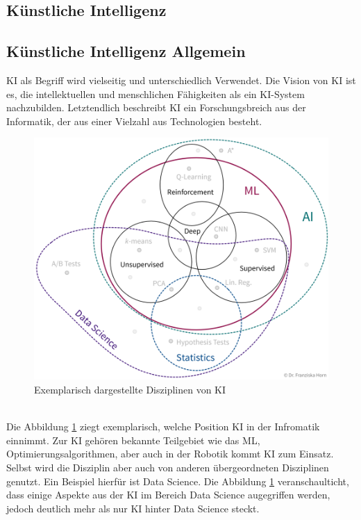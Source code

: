 \begin{onehalfspace}
    \newpage
    \section{Künstliche Intelligenz}
    \label{subsec:KIandML}
    \subsection{Künstliche Intelligenz Allgemein}
    \label{subsubsec:KIAllgemein}
        \ac{KI} als Begriff wird vielseitig und unterschiedlich Verwendet. Die Vision von \ac{KI} ist es, die intellektuellen und menschlichen Fähigkeiten als ein KI-System nachzubilden.\cite{Lis2019} Letztendlich beschreibt \ac{KI} ein Forschungsbreich aus der Informatik, der aus einer Vielzahl aus Technologien besteht.\cite{HEGKI2019Definition} 
        \begin{figure}[h]
            \centering
            \includegraphics[width = \textwidth]{Bilder/ml_toolset.png}
            \caption{Exemplarisch dargestellte Disziplinen von \ac{KI}\cite{Horn2022}}
            \label{fig:ml_toolset}
        \end{figure}
        \\
        Die Abbildung \ref*{fig:ml_toolset} ziegt exemplarisch, welche Position \ac*{KI} in der Infromatik einnimmt. Zur \ac{KI} gehören bekannte Teilgebiet wie das \ac*{ML}, Optimierungsalgorithmen, aber auch  in der Robotik kommt \ac{KI} zum Einsatz. Selbst wird die Disziplin aber auch von anderen übergeordneten Disziplinen genutzt.\cite{HEGKI2019Definition} Ein Beispiel hierfür ist Data Science. Die Abbildung \ref*{fig:ml_toolset} veranschaulticht, dass einige Aspekte aus der \ac{KI} im Bereich Data Science augegriffen werden, jedoch deutlich mehr als nur \ac{KI} hinter Data Science steckt.

\end{onehalfspace}
